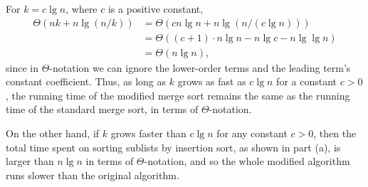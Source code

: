 For $k=c\lg n$, where $c$ is a positive constant,
\begin{align*}
    \Theta(nk+n\lg(n/k)) &= \Theta(cn\lg n+n\lg(n/(c\lg n))) \\
    &= \Theta((c+1)\cdot n\lg n-n\lg c-n\lg\lg n) \\
    &= \Theta(n\lg n),
\end{align*}
since in $\Theta$-notation we can ignore the lower-order terms and the leading term's constant coefficient.
Thus, as long as $k$ grows as fast as $c\lg n$ for a constant $c>0$, the running time of the modified merge sort remains the same as the running time of the standard merge sort, in terms of $\Theta$-notation.

On the other hand, if $k$ grows faster than $c\lg n$ for any constant $c>0$, then the total time spent on sorting sublists by insertion sort, as shown in part (a), is larger than $n\lg n$ in terms of $\Theta$-notation, and so the whole modified algorithm runs slower than the original algorithm.
